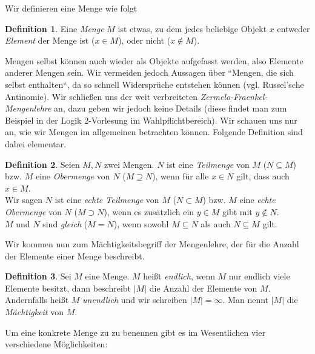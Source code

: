 \documentclass[11pt, a4paper]{article}
\theoremstyle{definition}
\newtheorem{definition}{Definition}[section]
\theoremstyle{plain}
\numberwithin{equation}{section}
\begin{document}
Wir definieren eine Menge wie folgt
\begin{definition}
	Eine \textit{Menge} $M$ ist etwas, zu dem jedes beliebige Objekt $x$ entweder \textit{Element} der Menge ist ($x \in M$), oder nicht ($x \notin M$).
\end{definition}
Mengen selbst können auch wieder als Objekte aufgefasst werden, also Elemente anderer Mengen sein. Wir vermeiden jedoch Aussagen über ``Mengen, die sich selbst enthalten``, da so schnell Widersprüche entstehen können (vgl. Russel'sche Antinomie). Wir schließen uns der weit verbreiteten \textit{Zermelo-Fraenkel-Mengenlehre} an, dazu geben wir jedoch keine Details (diese findet man zum Beispiel in der Logik 2-Vorlesung im Wahlpflichtbereich). Wir schauen uns nur an, wie wir Mengen im allgemeinen betrachten können. Folgende Definition sind dabei elementar.
\begin{definition}\label{def:subsets}
	Seien $M, N$ zwei Mengen. $N$ ist eine \textit{Teilmenge} von $M$ ($N \subseteq M$) bzw. $M$ eine \textit{Obermenge} von $N$ ($M \supseteq N$), wenn für alle $x \in N$ gilt, dass auch $x \in M$.\\
	Wir sagen $N$ ist eine \textit{echte Teilmenge} von $M$ ($N \subset M$) bzw. $M$ eine \textit{echte Obermenge} von $N$ ($M \supset N$), wenn es zusätzlich ein $y \in M$ gibt mit $y \notin N$.\\
	$M$ und $N$ sind \textit{gleich} ($M = N$), wenn sowohl $M \subseteq N$ als auch $N \subseteq M$ gilt.
\end{definition}
Wir kommen nun zum Mächtigkeitsbegriff der Mengenlehre, der für die Anzahl der Elemente einer Menge beschreibt.
\begin{definition}
	Sei $M$ eine Menge. $M$ heißt \textit{endlich}, wenn $M$ nur endlich viele Elemente besitzt, dann beschreibt $|M|$ die Anzahl der Elemente von $M$. Andernfalls heißt $M$ \textit{unendlich} und wir schreiben $|M| = \infty$. Man nennt $|M|$ die \textit{Mächtigkeit} von $M$.
\end{definition}
Um eine konkrete Menge zu zu benennen gibt es im Wesentlichen vier verschiedene Möglichkeiten:
\end{document}
